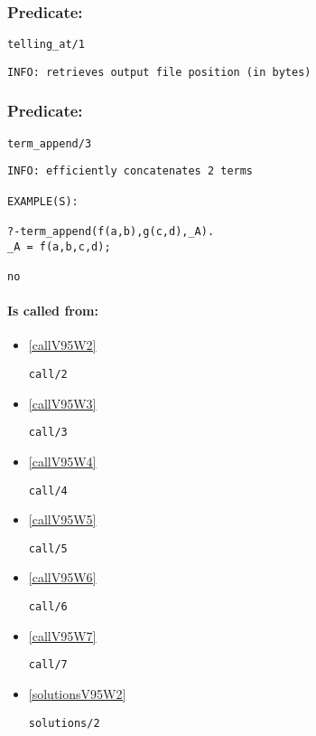 \subsubsection{Predicate:} \label{tellingV95WatV95W1}

\begin{verbatim}
telling_at/1
\end{verbatim}

{\small \begin{verbatim}
INFO: retrieves output file position (in bytes)

\end{verbatim}}

\subsubsection{Predicate:} \label{termV95WappendV95W3}

\begin{verbatim}
term_append/3
\end{verbatim}

{\small \begin{verbatim}
INFO: efficiently concatenates 2 terms

EXAMPLE(S):

?-term_append(f(a,b),g(c,d),_A).
_A = f(a,b,c,d);

no

\end{verbatim}}
\paragraph{Is called from:} 
\begin{itemize}
\item \ref{callV95W2} 
\begin{verbatim}
call/2
\end{verbatim}

\item \ref{callV95W3} 
\begin{verbatim}
call/3
\end{verbatim}

\item \ref{callV95W4} 
\begin{verbatim}
call/4
\end{verbatim}

\item \ref{callV95W5} 
\begin{verbatim}
call/5
\end{verbatim}

\item \ref{callV95W6} 
\begin{verbatim}
call/6
\end{verbatim}

\item \ref{callV95W7} 
\begin{verbatim}
call/7
\end{verbatim}

\item \ref{solutionsV95W2} 
\begin{verbatim}
solutions/2
\end{verbatim}

\end{itemize}


